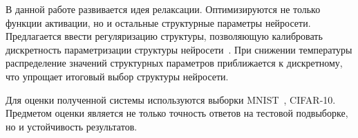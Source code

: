 \documentclass[12pt,twoside]{article}
\begin{document}
В данной работе развивается идея релаксации. Оптимизируются не только функции активации, но и остальные структурные параметры нейросети. Предлагается ввести регуляризацию структуры, позволяющую калибровать дискретность параметризации структуры нейросети~\cite{softmax}. При снижении температуры распределение значений структурных параметров приближается к дискретному, что упрощает итоговый выбор структуры нейросети. 

Для оценки полученной системы используются выборки MNIST~\cite{lecun-mnist}, CIFAR-10. Предметом оценки является не только точность ответов на тестовой подвыборке, но и устойчивость результатов.



\end{document}
